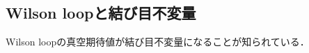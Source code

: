 \documentclass[TQFT_main]{subfiles}
\begin{document}
\subsection{Wilson loopと結び目不変量}

Wilson loopの真空期待値が結び目不変量になることが知られている．

\end{document}
